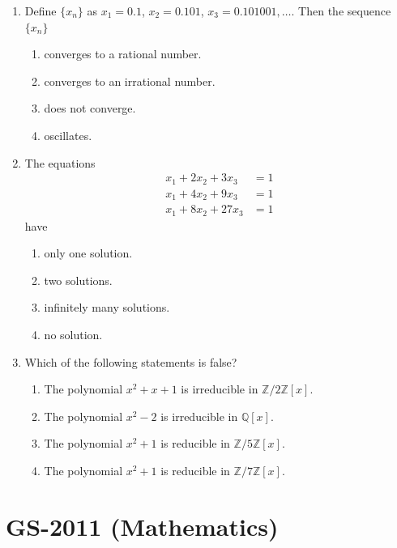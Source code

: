 \documentclass[11pt, a4paper]{article}
\begin{document}
\begin{enumerate}
  \item Define $\{x_n\}$ as $x_1 = 0.1$, $x_2 = 0.101$, $x_3 = 0.101001, \dots$. Then the sequence $\{x_n\}$
  \begin{enumerate}[label=(\alph*)]
    \item converges to a rational number.
    \item converges to an irrational number.
    \item does not converge.
    \item oscillates.
  \end{enumerate}

  \item The equations
  \begin{align*}
    x_1 + 2x_2 + 3x_3 &= 1 \\
    x_1 + 4x_2 + 9x_3 &= 1 \\
    x_1 + 8x_2 + 27x_3 &= 1
  \end{align*}
  have
  \begin{enumerate}[label=(\alph*)]
    \item only one solution.
    \item two solutions.
    \item infinitely many solutions.
    \item no solution.
  \end{enumerate}

  \item Which of the following statements is false?
  \begin{enumerate}[label=(\alph*)]
    \item The polynomial $x^2 + x + 1$ is irreducible in $\mathbb{Z}/2\mathbb{Z}[x]$.
    \item The polynomial $x^2 - 2$ is irreducible in $\mathbb{Q}[x]$.
    \item The polynomial $x^2 + 1$ is reducible in $\mathbb{Z}/5\mathbb{Z}[x]$.
    \item The polynomial $x^2 + 1$ is reducible in $\mathbb{Z}/7\mathbb{Z}[x]$.
  \end{enumerate}
\end{enumerate}

\newpage

\section{GS-2011 (Mathematics)}
\end{document}
